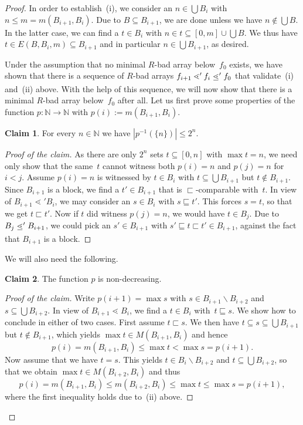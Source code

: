 \documentclass{amsart}
\numberwithin{theorem}{section}
\theoremstyle{definition}
\newtheorem*{claim}{Claim}
\newcommand\ledot{\mathrel{\ensurestackMath{%
  \stackengine{-.5ex}{\lessdot}{-}{U}{c}{F}{F}{S}}}}
\begin{document}
\begin{proof}
In order to establish~(i), we consider an $n\in\bigcup B_i$ with $n\leq m=m(B_{i+1},B_i)$. Due to $B\subseteq B_{i+1}$, we are done unless we have $n\notin\bigcup B$. In the latter case, we can find a $t\in B_i$ with $n\in t\subseteq [0,m]\cup\bigcup B$. We thus have $t\in E(B,B_i,m)\subseteq B_{i+1}$ and in particular $n\in\bigcup B_{i+1}$, as desired.

Under the assumption that no minimal $R$-bad array below~$f_0$ exists, we have shown that there is a sequence of $R$-bad arrays $f_{i+1}\lessdot' f_i\ledot' f_0$ that validate~(i) and~(ii) above. With the help of this sequence, we will now show that there is a minimal $R$-bad array below~$f_0$ after all. Let us first prove some properties of the function $p:\mathbb N\to\mathbb N$ with $p(i):=m(B_{i+1},B_i)$.

\begin{claim}
  For every $n\in\mathbb N$ we have $|p^{-1}(\{n\})|\leq 2^n$.
\end{claim}
{\renewcommand{\qedsymbol}{$\diamond$}
\begin{proof}[Proof of the claim]
As there are only $2^n$ sets $t\subseteq[0,n]$ with $\max t=n$, we need only show that the same~$t$ cannot witness both $p(i)=n$ and $p(j)=n$ for $i<j$. Assume $p(i)=n$ is witnessed by $t\in B_i$ with $t\subseteq\bigcup B_{i+1}$ but $t\notin B_{i+1}$. Since $B_{i+1}$ is a block, we find a $t'\in B_{i+1}$ that is $\sqsubset$-comparable with~$t$. In view of $B_{i+1}\lessdot' B_i$, we may consider an $s\in B_i$ with $s\sqsubseteq t'$. This forces $s=t$, so that we get $t\sqsubset t'$. Now if $t$ did witness $p(j)=n$, we would have $t\in B_j$. Due to $B_j\ledot' B_{i+1}$, we could pick an $s'\in B_{i+1}$ with $s'\sqsubseteq t\sqsubset t'\in B_{i+1}$, against the fact that $B_{i+1}$ is a block.
\end{proof}}

We will also need the following.
   
\begin{claim}
  The function $p$ is non-decreasing.
\end{claim}
{\renewcommand{\qedsymbol}{$\diamond$}
\begin{proof}[Proof of the claim]
Write $p(i+1)=\max s$ with $s\in B_{i+1}\backslash B_{i+2}$ and $s\subseteq\bigcup B_{i+2}$. In view of $B_{i+1}\lessdot B_i$, we find a $t\in B_i$ with~$t\sqsubseteq s$. We show how to conclude in either of two cases. First assume $t\sqsubset s$. We then have $t\subseteq s\subseteq\bigcup B_{i+1}$ but $t\notin B_{i+1}$, which yields $\max t\in M(B_{i+1},B_i)$ and hence
\begin{equation*}
p(i)=m(B_{i+1},B_i)\leq\max t<\max s=p(i+1).
\end{equation*}
Now assume that we have $t=s$. This yields $t\in B_i\backslash B_{i+2}$ and $t\subseteq\bigcup B_{i+2}$, so that we obtain $\max t\in M(B_{i+2},B_i)$ and thus
\begin{equation*}
    p(i)=m(B_{i+1},B_i)\leq m(B_{i+2},B_i)\leq\max t\leq\max s=p(i+1),
\end{equation*}
where the first inequality holds due to~(ii) above.
\end{proof}}


\end{proof}
\end{document}
